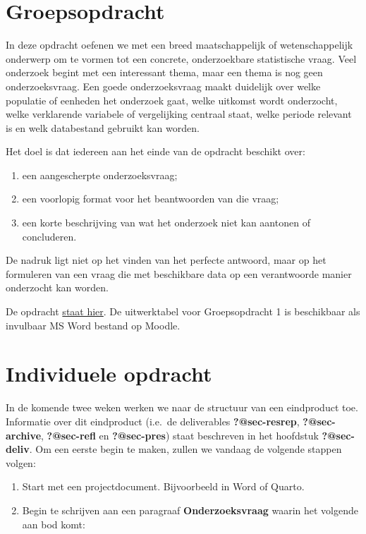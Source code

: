 \documentclass[
  letterpaper,
  DIV=11,
  numbers=noendperiod]{scrreprt}
\providecommand{\tightlist}{%
  \setlength{\itemsep}{0pt}\setlength{\parskip}{0pt}}
\begin{document}
\section{Groepsopdracht}\label{groepsopdracht}

In deze opdracht oefenen we met een breed maatschappelijk of
wetenschappelijk onderwerp om te vormen tot een concrete, onderzoekbare
statistische vraag. Veel onderzoek begint met een interessant thema,
maar een thema is nog geen onderzoeksvraag. Een goede onderzoeksvraag
maakt duidelijk over welke populatie of eenheden het onderzoek gaat,
welke uitkomst wordt onderzocht, welke verklarende variabele of
vergelijking centraal staat, welke periode relevant is en welk
databestand gebruikt kan worden.

Het doel is dat iedereen aan het einde van de opdracht beschikt over:

\begin{enumerate}
\def\labelenumi{\arabic{enumi}.}
\tightlist
\item
  een aangescherpte onderzoeksvraag;
\item
  een voorlopig format voor het beantwoorden van die vraag;
\item
  een korte beschrijving van wat het onderzoek niet kan aantonen of
  concluderen.
\end{enumerate}

De nadruk ligt niet op het vinden van het perfecte antwoord, maar op het
formuleren van een vraag die met beschikbare data op een verantwoorde
manier onderzocht kan worden.

De opdracht \href{opdracht/groepsopdracht1.html}{staat hier}. De
uitwerktabel voor Groepsopdracht 1 is beschikbaar als invulbaar MS Word
bestand op Moodle.

\section{Individuele opdracht}\label{individuele-opdracht}

In de komende twee weken werken we naar de structuur van een eindproduct
toe. Informatie over dit eindproduct (i.e.~de deliverables
\textbf{?@sec-resrep}, \textbf{?@sec-archive}, \textbf{?@sec-refl} en
\textbf{?@sec-pres}) staat beschreven in het hoofdstuk
\textbf{?@sec-deliv}. Om een eerste begin te maken, zullen we vandaag de
volgende stappen volgen:

\begin{enumerate}
\def\labelenumi{\arabic{enumi}.}
\tightlist
\item
  Start met een projectdocument. Bijvoorbeeld in Word of Quarto.
\item
  Begin te schrijven aan een paragraaf \textbf{Onderzoeksvraag} waarin
  het volgende aan bod komt:
\end{enumerate}
\end{document}

